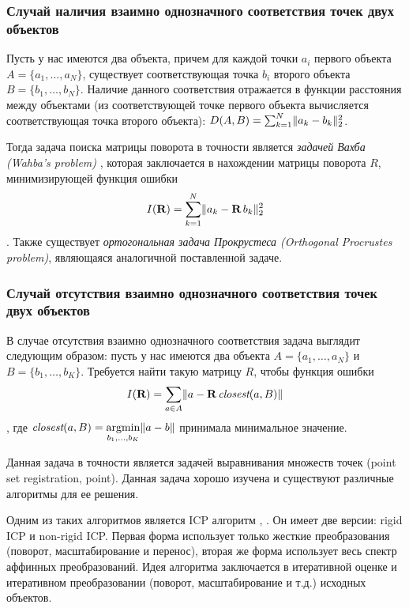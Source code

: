 \subsubsection{Случай наличия взаимно однозначного соответствия точек двух объектов}
Пусть у нас имеются два объекта, причем для каждой точки $a_{i}$ первого объекта $A = \{a_{1}, \ldots, a_{N}\}$, существует соответствующая точка $b_{i}$ второго объекта $B = \{b_{1}, \ldots, b_{N}\}$. Наличие данного соответствия отражается в функции расстояния между объектами (из соответствующей точке первого объекта вычисляется соответствующая точка второго объекта): $D(A, B) = \sum_{k=1}^{N}  \lVert a_{k} - b_{k}\rVert_{2}^{2}$. 

Тогда задача поиска матрицы поворота в точности является \textit{задачей Вахба (Wahba's problem)} \cite{wahba}, которая заключается в нахождении матрицы поворота $R$, минимизирующей функция ошибки \[I(\textbf{R}) = \sum_{k=1}^{N}  \lVert a_{k} - \textbf{R} \, b_{k}\rVert_{2}^{2} \]. Также существует \textit{ортогональная задача Прокрустеса (Orthogonal Procrustes problem)}, являющаяся аналогичной поставленной задаче.

\subsubsection{Случай отсутствия взаимно однозначного соответствия точек двух объектов}

В случае отсутствия взаимно однозначного соответствия задача выглядит следующим образом: пусть у нас имеются два объекта $A = \{a_{1}, \ldots, a_{N}\}$ и $B = \{b_{1}, \ldots, b_{K}\}$. Требуется найти такую матрицу $R$, чтобы функция ошибки \[I(\textbf{R}) = \sum\limits_{a \in A} \lVert a - \textbf{R} \, \textit{closest}(a, B)\rVert \], где $\textit{closest}(a, B) = \operatorname*{argmin}\limits_{b_{1}, \dots , b_{K}} \lVert a - b\rVert$ принимала минимальное значение.


Данная задача в точности является задачей выравнивания множеств точек (point set registration, point). Данная задача хорошо изучена и существуют различные алгоритмы для ее решения.

Одним из таких алгоритмов является ICP алгоритм \cite{icp-main}, \cite{icp-2}. Он имеет две версии: rigid ICP и non-rigid ICP. Первая форма использует только жесткие преобразования (поворот, масштабирование и перенос), вторая же форма использует весь спектр аффинных преобразований. Идея алгоритма заключается в итеративной оценке и итеративном преобразовании (поворот, масштабирование и т.д.) исходных объектов.


